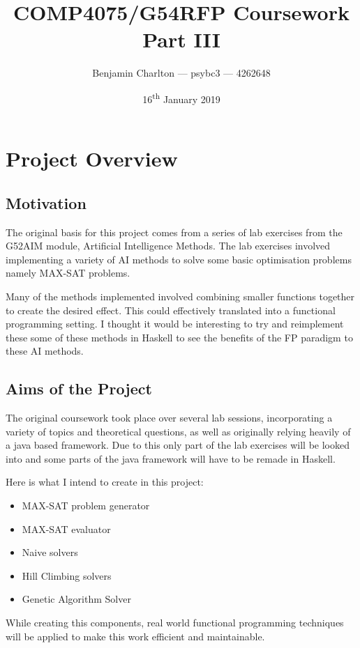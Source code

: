 \documentclass[a4paper]{article}
\title{COMP4075/G54RFP Coursework Part III\vspace{-6mm}}
\date{\vspace{-3mm}16\textsuperscript{th} January 2019}
\author{Benjamin Charlton --- psybc3 --- 4262648\vspace{-8mm}}
\begin{document}

\maketitle
\vspace{-12mm}

\section{Project Overview}
\subsection{Motivation}
The original basis for this project comes from a series of lab exercises from the G52AIM module, Artificial Intelligence Methods.
The lab exercises involved implementing a variety of AI methods to solve some basic optimisation problems namely MAX-SAT problems.
\par
Many of the methods implemented involved combining smaller functions together to create the desired effect.
This could effectively translated into a functional programming setting.
I thought it would be interesting to try and reimplement these some of these methods in Haskell to see the benefits of the FP paradigm to these AI methods.

\subsection{Aims of the Project}
The original coursework took place over several lab sessions, incorporating a variety of topics and theoretical questions, as well as originally relying heavily of a java based framework.
Due to this only part of the lab exercises will be looked into and some parts of the java framework will have to be remade in Haskell.
\par
Here is what I intend to create in this project:\vspace*{-4mm}
\begin{multicols}{3}
    \begin{itemize}[noitemsep,nolistsep]
        \item MAX-SAT problem generator
        \item MAX-SAT evaluator
        \item Naive solvers
        \item Hill Climbing solvers
        \item Genetic Algorithm Solver
    \end{itemize}
\end{multicols}\vspace*{-3mm}
While creating this components, real world functional programming techniques will be applied to make this work efficient and maintainable.
\end{document}
